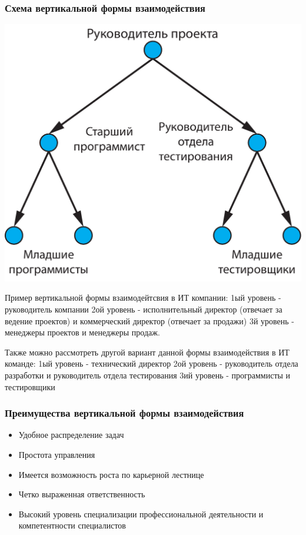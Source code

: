 \documentclass{../industrial-development}
\begin{document}
\begin{frame} \frametitle{Схема вертикальной формы взаимодействия}
	\begin{block}{}
		\centerline{\includegraphics[height=0.7\textheight]{vertical.pdf}}
	\end{block}
\end{frame}

\lecturenotes
Пример вертикальной формы взаимодейтсвия в ИТ компании:
1ый уровень - руководитель компании
2ой уровень - исполнительный директор (отвечает за ведение проектов) и коммерческий директор (отвечает за продажи)
3й уровень - менеджеры проектов и менеджеры продаж.

Также можно рассмотреть другой вариант данной формы взаимодействия в ИТ команде:
1ый уровень -  технический директор
2ой уровень -  руководитель отдела разработки и руководитель отдела тестирования
3ий уровень - программисты и тестировщики


\begin{frame} \frametitle{Преимущества вертикальной формы взаимодействия}

  
  \begin{itemize}
  \item Удобное распределение задач
  \item Простота управления
  \item Имеется возможность роста по карьерной лестнице
  \item Четко выраженная ответственность
  \item Высокий уровень специализации профессиональной деятельности и компетентности специалистов

  \end{itemize}
\end{frame}
\end{document}
